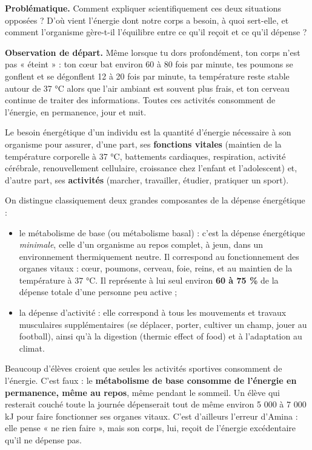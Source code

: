 \documentclass[11pt]{article}
\newcommand{\cle}[1]{{\popxbold\color{popdark}#1}}
\newcounter{popsec}
\newcounter{popsub}
\newcommand{\courssub}[1]{%
  \stepcounter{popsub}%
  \par\vspace{9pt}\noindent{\popxbold\fontsize{11.5}{13}\selectfont\color{popink}{\color{poporange}\thepopsec.\thepopsub}\hspace{6pt}#1}\par\nopagebreak\vspace{4pt}
}
\begin{document}
\textbf{Problématique.} Comment expliquer scientifiquement ces deux situations opposées ? D'où vient l'énergie dont notre corps a besoin, à quoi sert-elle, et comment l'organisme gère-t-il l'équilibre entre ce qu'il reçoit et ce qu'il dépense ?

\courssub{Pourquoi l'organisme a-t-il besoin d'énergie ?}

\textbf{Observation de départ.} Même lorsque tu dors profondément, ton corps n'est pas « éteint » : ton cœur bat environ 60 à 80 fois par minute, tes poumons se gonflent et se dégonflent 12 à 20 fois par minute, ta température reste stable autour de 37 °C alors que l'air ambiant est souvent plus frais, et ton cerveau continue de traiter des informations. Toutes ces activités consomment de l'énergie, en permanence, jour et nuit.

\begin{definition}
Le \cle{besoin énergétique} d'un individu est la quantité d'énergie nécessaire à son organisme pour assurer, d'une part, ses \textbf{fonctions vitales} (maintien de la température corporelle à 37 °C, battements cardiaques, respiration, activité cérébrale, renouvellement cellulaire, croissance chez l'enfant et l'adolescent) et, d'autre part, ses \textbf{activités} (marcher, travailler, étudier, pratiquer un sport).
\end{definition}

On distingue classiquement deux grandes composantes de la dépense énergétique :

\begin{itemize}
\item le \cle{métabolisme de base} (ou métabolisme basal) : c'est la dépense énergétique \emph{minimale}, celle d'un organisme au repos complet, à jeun, dans un environnement thermiquement neutre. Il correspond au fonctionnement des organes vitaux : cœur, poumons, cerveau, foie, reins, et au maintien de la température à 37 °C. Il représente à lui seul environ \textbf{60 à 75 \%} de la dépense totale d'une personne peu active ;
\item la \cle{dépense d'activité} : elle correspond à tous les mouvements et travaux musculaires supplémentaires (se déplacer, porter, cultiver un champ, jouer au football), ainsi qu'à la digestion (thermic effect of food) et à l'adaptation au climat.
\end{itemize}

\begin{attention}
Beaucoup d'élèves croient que seules les activités sportives consomment de l'énergie. C'est faux : le \textbf{métabolisme de base consomme de l'énergie en permanence, même au repos}, même pendant le sommeil. Un élève qui resterait couché toute la journée dépenserait tout de même environ 5 000 à 7 000 kJ pour faire fonctionner ses organes vitaux. C'est d'ailleurs l'erreur d'Amina : elle pense « ne rien faire », mais son corps, lui, reçoit de l'énergie excédentaire qu'il ne dépense pas.
\end{attention}
\end{document}
